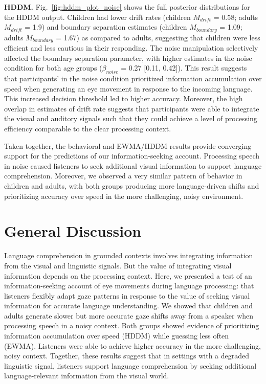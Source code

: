 \documentclass[10pt, letterpaper]{article}
\begin{document}
\textbf{HDDM.} Fig.~\ref{fig:hddm_plot_noise} shows the full posterior
distributions for the HDDM output. Children had lower drift rates
(children \(M_{drift}\) = 0.58; adults \(M_{drift}\) = 1.9) and boundary
separation estimates (children \(M_{boundary}\) = 1.09; adults
\(M_{boundary}\) = 1.67) as compared to adults, suggesting that children
were less efficient and less cautious in their responding. The noise
manipulation selectively affected the boundary separation parameter,
with higher estimates in the noise condition for both age groups
(\(\beta_{noise}\) = 0.27 {[}0.11, 0.42{]}). This result suggests that
participants' in the noise condition prioritized information
accumulation over speed when generating an eye movement in response to
the incoming language. This increased decision threshold led to higher
accuracy. Moreover, the high overlap in estimates of drift rate suggests
that participants were able to integrate the visual and auditory signals
such that they could achieve a level of processing efficiency comparable
to the clear processing context.

Taken together, the behavioral and EWMA/HDDM results provide converging
support for the predictions of our information-seeking account.
Processing speech in noise caused listeners to seek additional visual
information to support language comprehension. Moreover, we observed a
very similar pattern of behavior in children and adults, with both
groups producing more language-driven shifts and prioritizing accuracy
over speed in the more challenging, noisy environment.

\section{General Discussion}\label{general-discussion}

Language comprehension in grounded contexts involves integrating
information from the visual and linguistic signals. But the value of
integrating visual information depends on the processing context. Here,
we presented a test of an information-seeking account of eye movements
during language processing: that listeners flexibly adapt gaze patterns
in response to the value of seeking visual information for accurate
language understanding. We showed that children and adults generate
slower but more accurate gaze shifts away from a speaker when processing
speech in a noisy context. Both groups showed evidence of prioritizing
information accumulation over speed (HDDM) while guessing less often
(EWMA). Listeners were able to achieve higher accuracy in the more
challenging, noisy context. Together, these results suggest that in
settings with a degraded linguistic signal, listeners support language
comprehension by seeking additional language-relevant information from
the visual world.
\end{document}
